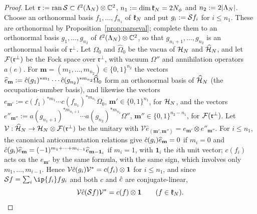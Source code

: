 \begin{proof}
Let $\mathfrak r:=\operatorname{ran}\mathcal{S}\subset\ell^2(\Lambda_N)\otimes\mathbb{C}^2$, $n_1:=\dim\mathfrak{k}_N=2N_{\phi}$ and $n_2:=2\lvert\Lambda_N\rvert$. Choose an
orthonormal basis $f_1,\dots,f_{n_1}$ of $\mathfrak{k}_N$ and put $g_i:=\mathcal{S} f_i$ for $i\le n_1$. These are orthonormal by
Proposition~\ref{prop:parseval}; complete them to an orthonormal basis $g_1,\dots,g_{n_2}$ of
$\ell^2(\Lambda_N)\otimes\mathbb{C}^2$, so that $g_{n_1+1},\dots,g_{n_2}$ is an orthonormal basis of $\mathfrak r^\perp$. Let
$\Omega_0$ and $\widehat\Omega_0$ be the vacua of $\mathcal{H}_N$ and $\widehat{\mathcal{H}}_N$, and let $\mathcal{F}(\mathfrak r^\perp)$ be the Fock space
over $\mathfrak r^\perp$, with vacuum $\Omega''$ and annihilation operators $a(e)$. For
$\mathbf m=(m_1,\dots,m_{n_2})\in\{0,1\}^{n_2}$ the vectors
$\widehat e_{\mathbf m}:=\hat{c}(g_1)^{*m_1}\cdots\hat{c}(g_{n_2})^{*m_{n_2}}\widehat\Omega_0$ form an orthonormal basis of
$\widehat{\mathcal{H}}_N$ (the occupation-number basis), and likewise the vectors
$e_{\mathbf m'}:=c(f_1)^{*m_1}\cdots c(f_{n_1})^{*m_{n_1}}\Omega_0$, $\mathbf m'\in\{0,1\}^{n_1}$, for $\mathcal{H}_N$, and the
vectors $e''_{\mathbf m''}:=a(g_{n_1+1})^{*m_{n_1+1}}\cdots a(g_{n_2})^{*m_{n_2}}\Omega''$, $\mathbf m''\in\{0,1\}^{n_2-n_1}$, for
$\mathcal{F}(\mathfrak r^\perp)$. Let $\mathcal V:\widehat{\mathcal{H}}_N\to\mathcal{H}_N\otimes\mathcal{F}(\mathfrak r^\perp)$ be the unitary with
$\mathcal V\widehat e_{(\mathbf m',\mathbf m'')}=e_{\mathbf m'}\otimes e''_{\mathbf m''}$. For $i\le n_1$, the canonical
anticommutation relations give $\hat{c}(g_i)\widehat e_{\mathbf m}=0$ if $m_i=0$ and
$\hat{c}(g_i)\widehat e_{\mathbf m}=(-1)^{m_1+\dots+m_{i-1}}\widehat e_{\mathbf m-\mathbf 1_i}$ if $m_i=1$, with $\mathbf 1_i$ the
$i$th unit vector; $c(f_i)$ acts on the $e_{\mathbf m'}$ by the same formula, with the same sign, which involves only
$m_1,\dots,m_{i-1}$. Hence $\mathcal V\hat{c}(g_i)\mathcal V^*=c(f_i)\otimes\mathbf{1}$ for $i\le n_1$, and since
$\Sa f=\sum_i\ip{f_i}fg_i$ and both $c$ and $\hat{c}$ are conjugate-linear,
\begin{equation}\label{eq:V-intertwines}
\mathcal V\hat{c}(\mathcal{S} f)\mathcal V^*=c(f)\otimes\mathbf{1}\qquad(f\in\mathfrak{k}_N).
\end{equation}


\end{proof}
